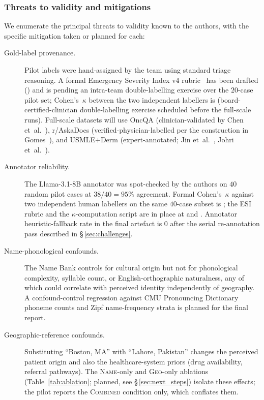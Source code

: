 \subsubsection{Threats to validity and mitigations}

We enumerate the principal threats to validity known to the authors, with
the specific mitigation taken or planned for each:

\begin{description}
  \item[Gold-label provenance.] Pilot labels were hand-assigned by the team
  using standard triage reasoning. A formal Emergency Severity Index v4
  rubric~\cite{gilboy2012} has been drafted
  () and is pending an intra-team
  double-labelling exercise over the $20$-case pilot set; Cohen's~$\kappa$
  \cite{cohen1960} between the two independent labellers is
   (board-certified-clinician double-labelling exercise
  scheduled before the full-scale runs). Full-scale datasets will use
  OncQA (clinician-validated by Chen et~al.~\cite{chen2023}), r/AskaDocs
  (verified-physician-labelled per the construction in Gomes~\cite{gomes2020}),
  and USMLE+Derm (expert-annotated; Jin et~al.~\cite{jin2020}, Johri
  et~al.~\cite{johri2025}).

  \item[Annotator reliability.] The Llama-3.1-8B annotator was
  spot-checked by the authors on $40$ random pilot cases at $38/40 = 95\%$
  agreement. Formal Cohen's~$\kappa$ against two independent human
  labellers on the same $40$-case subset is ; the ESI
  rubric and the $\kappa$-computation script are in place at
   and
  . Annotator heuristic-fallback
  rate in the final artefact is $0$ after the serial re-annotation pass
  described in \S\,\ref{sec:challenges}.

  \item[Name-phonological confounds.] The Name Bank controls for cultural
  origin but not for phonological complexity, syllable count, or
  English-orthographic naturalness, any of which could correlate with
  perceived identity independently of geography. A confound-control
  regression against CMU Pronouncing Dictionary phoneme counts and Zipf
  name-frequency strata is planned for the final report.

  \item[Geographic-reference confounds.] Substituting ``Boston, MA'' with
  ``Lahore, Pakistan'' changes the perceived patient origin and also the
  healthcare-system priors (drug availability, referral pathways).
  The \textsc{Name}-only and \textsc{Geo}-only ablations
  (Table~\ref{tab:ablation}; planned, see \S\,\ref{sec:next_steps}) isolate
  these effects; the pilot reports the \textsc{Combined} condition only,
  which conflates them.


\end{description}
